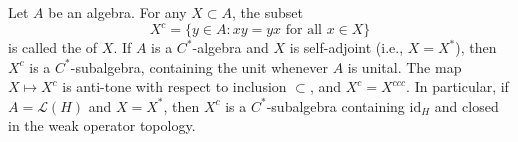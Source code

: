 Let $A$ be an algebra. For any $X \subset A$, the subset
$$X^c = \{y \in A : xy = yx \text{ for all } x \in X\}$$
is called the  of $X$. If $A$ is a $C^*$-algebra and $X$ is self-adjoint (i.e., $X = X^*$), then $X^c$ is a $C^*$-subalgebra, containing the unit whenever $A$ is unital. The map $X \mapsto X^c$ is anti-tone with respect to inclusion $\subset$, and $X^c = X^{ccc}$. In particular, if $A = \mathcal{L}(H)$ and $X = X^*$, then $X^c$ is a $C^*$-subalgebra containing $\mathrm{id}_H$ and closed in the weak operator topology.
